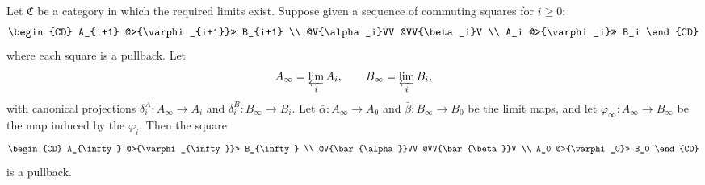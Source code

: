 Let $\mathfrak{C}$ be a category in which the required limits exist. Suppose given a sequence of commuting squares for $i \geq 0$:
$$
\begin{CD}
A_{i+1} @>{\varphi_{i+1}}>> B_{i+1} \\
@V{\alpha_i}VV @VV{\beta_i}V \\
A_i @>{\varphi_i}>> B_i
\end{CD}
$$
where each square is a pullback. Let
$$
A_{\infty} = \varprojlim_i A_i, \qquad B_{\infty} = \varprojlim_i B_i,
$$
with canonical projections $\delta_i^A : A_{\infty} \rightarrow A_i$ and $\delta_i^B : B_{\infty} \rightarrow B_i$. Let $\bar{\alpha} : A_{\infty} \rightarrow A_0$ and $\bar{\beta} : B_{\infty} \rightarrow B_0$ be the limit maps, and let $\varphi_{\infty} : A_{\infty} \rightarrow B_{\infty}$ be the map induced by the $\varphi_i$. Then the square
$$
\begin{CD}
A_{\infty} @>{\varphi_{\infty}}>> B_{\infty} \\
@V{\bar{\alpha}}VV @VV{\bar{\beta}}V \\
A_0 @>{\varphi_0}>> B_0
\end{CD}
$$
is a pullback.
